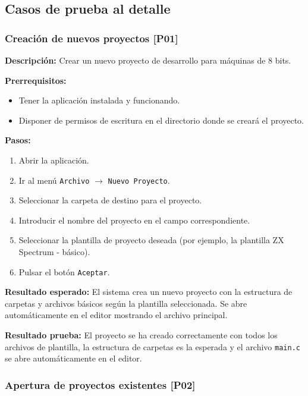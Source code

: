 \documentclass[../../main.tex]{subfiles}
\begin{document}
\clearpage

\subsection{Casos de prueba al detalle}

\subsubsection{Creación de nuevos proyectos [P01]}

\textbf{Descripción:} Crear un nuevo proyecto de desarrollo para máquinas de 8 bits.


\textbf{Prerrequisitos:} 
\begin{itemize}
\item Tener la aplicación instalada y funcionando.
\item Disponer de permisos de escritura en el directorio donde se creará el proyecto.
\end{itemize}

\textbf{Pasos:}
\begin{enumerate}
\item Abrir la aplicación.
\item Ir al menú \lstinline|Archivo| $\rightarrow$ \lstinline|Nuevo Proyecto|.
\item Seleccionar la carpeta de destino para el proyecto.
\item Introducir el nombre del proyecto en el campo correspondiente.
\item Seleccionar la plantilla de proyecto deseada (por ejemplo, la plantilla ZX Spectrum - básico).
\item Pulsar el botón \lstinline|Aceptar|.
\end{enumerate}

\textbf{Resultado esperado:} El sistema crea un nuevo proyecto con la estructura de carpetas y archivos básicos según la plantilla seleccionada. Se abre automáticamente en el editor mostrando el archivo principal.

\textbf{Resultado prueba:} El proyecto se ha creado correctamente con todos los archivos de plantilla, la estructura de carpetas es la esperada y el archivo \lstinline|main.c| se abre automáticamente en el editor.

\clearpage

\subsubsection{Apertura de proyectos existentes [P02]}
    
\end{document}
